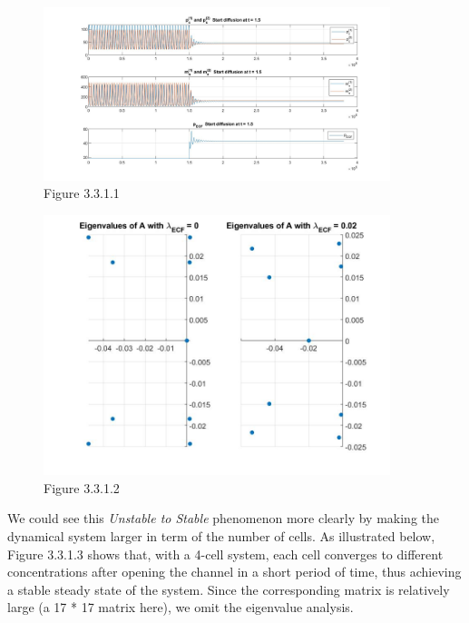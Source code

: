 \documentclass[12pt]{article}
\renewcommand{\(}{\left (}
\renewcommand{\)}{\right )}
\begin{document}
\begin{figure}[h!]
    \centering
	\begin{minipage}{0.99\textwidth}
		\centering
		\includegraphics[width=0.9\textwidth]{US.jpg}
		\caption*{\small Figure 3.3.1.1}
	\end{minipage}
\end{figure}

\begin{figure}[h!]
    \centering
	\begin{minipage}{0.99\textwidth}
		\centering
		\includegraphics[width=0.9\textwidth]{USEi.jpg}
		\caption*{\small Figure 3.3.1.2}
	\end{minipage}
\end{figure}

\newpage

We could see this \textit{Unstable to Stable} phenomenon more clearly by making the dynamical system larger in term of the number of cells. As illustrated below, Figure 3.3.1.3 shows that, with a 4-cell system, each cell converges to different concentrations after opening the channel in a short period of time, thus achieving a stable steady state of the system. Since the corresponding matrix is relatively large (a 17 * 17 matrix here), we omit the eigenvalue analysis. \\
\end{document}
